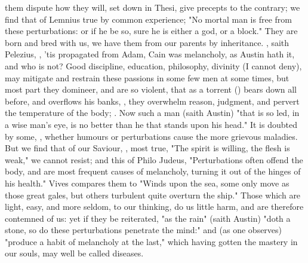 them dispute how they will, set down in Thesi, give precepts to the contrary;
we find that of Lemnius true by common experience; "No
mortal man is free from these perturbations: or if he be so, sure he is either
a god, or a block." They are born and bred with us, we have them from our
parents by inheritance. , saith
Pelezius, , 'tis
propagated from Adam, Cain was melancholy, as Austin hath
it, and who is not? Good discipline, education, philosophy, divinity (I cannot
deny), may mitigate and restrain these passions in some few men at some times,
but most part they domineer, and are so violent, that as a
torrent () bears down all before, and overflows
his banks, , they overwhelm reason, judgment, and pervert the temperature of the
body; .
Now such a man (saith Austin) "that is so led, in a wise
man's eye, is no better than he that stands upon his head." It is doubted by
some, , whether
humours or perturbations cause the more grievous maladies. But we find that of
our Saviour, , most true, "The spirit is willing,
the flesh is weak," we cannot resist; and this of Philo
Judeus, "Perturbations often offend the body, and are most frequent causes of
melancholy, turning it out of the hinges of his health." Vives compares them to
"Winds upon the sea, some only move as those great gales,
but others turbulent quite overturn the ship." Those which are light, easy, and
more seldom, to our thinking, do us little harm, and are therefore contemned of
us: yet if they be reiterated, "as the rain" (saith
Austin) "doth a stone, so do these perturbations penetrate the mind:"
and (as one observes) "produce a habit of melancholy at
the last," which having gotten the mastery in our souls, may well be called
diseases.

